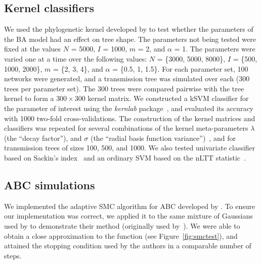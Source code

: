 \documentclass[12pt]{article}\usepackage[]{graphicx}\usepackage[]{color}
\newcommand{\software}[1]{\textit{#1}}
\newcommand{\sett}[1]{\{#1\}}
\begin{document}
\subsection*{Kernel classifiers}

We used the phylogenetic kernel developed by \textcite{poon2013mapping} to test
whether the parameters of the \gls{BA} model had an effect on tree shape. The
parameters not being tested were fixed at the values $N$ = 5000, $I$ = 1000,
$m$ = 2, and $\alpha$ = 1. The parameters were varied one at a time over the
following values: $N$ = \sett{3000, 5000, 8000}, $I$ = \sett{500, 1000, 2000},
$m$ = \sett{2, 3, 4}, and $\alpha$ = \sett{0.5, 1, 1.5}. For each parameter
set, 100 networks were generated, and a transmission tree was simulated over
each (300 trees per parameter set). The 300 trees were compared pairwise with
the tree kernel to form a $300 \times 300$ kernel matrix. We constructed a
\gls{kSVM} classifier for the parameter of interest using the
\software{kernlab} package~\autocite{karatzoglou2004kernlab}, and evaluated its
accuracy with 1000 two-fold cross-validations. The construction of the kernel
matrices and classifiers was repeated for several combinations of the kernel
meta-parameters $\lambda$ (the ``decay factor''), and $\sigma$ (the ``radial
basis function variance'')~\autocite[see][]{poon2013mapping}, and for
transmission trees of sizes 100, 500, and 1000. We also tested univariate
classifier based on Sackin's index~\autocite{shao1990tree} and an ordinary SVM
based on the \gls{nLTT} statistic~\autocite{janzen2015approximate}.

\subsection*{ABC simulations}

We implemented the adaptive \gls{SMC} algorithm for \gls{ABC} developed by
\textcite{del2012adaptive}. To ensure our implementation was correct, we
applied it to the same mixture of Gaussians used by
\citeauthor{del2012adaptive} to demonstrate their method (originally used
by~\textcite{sisson2007sequential}). We were able to obtain a close
approximation to the function (see Figure~\ref{fig:smctest}), and attained the
stopping condition used by the authors in a comparable number of steps.
\end{document}
